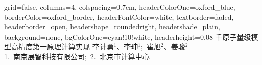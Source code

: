 \documentclass[a0paper,portrait,fontscale=0.35]{baposter}
\begin{document}

\begin{poster}
  {
    grid=false,
    columns=4,
    colspacing=0.7em,
    headerColorOne=oxford_blue,
    borderColor=oxford_border,
    headerFontColor=white,
    textborder=faded,
    headerborder=open,
    headershape=roundedright,
    headershade=plain,
    background=none,
    bgColorOne=cyan!10!white,
    headerheight=0.08\textheight
  }
  {
  }
  {\textsc{千原子量级模型高精度第一原理计算实现}}
  {
    \vspace{0.5em}
    李计勇$^1$、李珅$^1$;~崔旭$^2$、姜骏$^2$\\[0.1em]
    1.~南京展智科技有限公司;~2.~北京市计算中心
  }
  {
  }


\end{poster}
\end{document}
